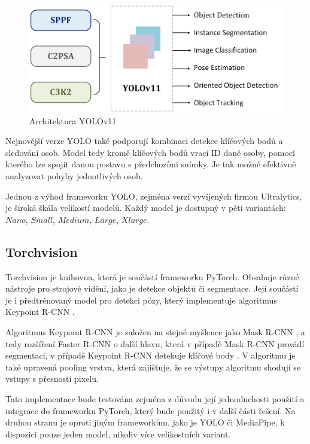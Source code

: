 \begin{figure}[]
    \centering
    \includegraphics[height=0.2\textheight]{Figures/yolo_v11.png}
    \caption{Architektura YOLOv11 \cite{yolov11}}
    \label{fig:yolov11}
\end{figure}

Nejnovější verze YOLO také podporují kombinaci detekce klíčových bodů a
sledování osob. Model tedy kromě klíčových bodů vrací ID dané osoby, pomocí
kterého lze spojit danou postavu s předchozími snímky. Je tak možné efektivně
analyzovat pohyby jednotlivých osob.

Jednou z výhod framevorku YOLO, zejména verzí vyvíjených firmou Ultralytics, je
široká škála velikostí modelů. Každý model je dostupný v pěti variantách:
$Nano$, $Small$, $Medium$, $Large$, $Xlarge$.

\subsection{Torchvision}

Torchvision je knihovna, která je součástí frameworku PyTorch. Obsahuje různé
nástroje pro strojové vidění, jako je detekce objektů či segmentace. Její
součástí je i předtrénovaný model pro detekci pózy, který implementuje
algoritmus Keypoint R-CNN \cite{keypoint-rcnn}.

Algoritmus Keypoint R-CNN je založen na stejné myšlence jako Mask R-CNN
\cite{mask-r-cnn}, a tedy rozšíření Faster R-CNN o další hlavu, která v případě
Mask R-CNN provádí segmentaci, v případě Keypoint R-CNN detekuje klíčové body
\cite{keypoint-rcnn}. V algoritmu je také upravená pooling vrstva, která
zajišťuje, že se výstupy algoritmu shodují se vstupy s přesností pixelu.

Tato implementace bude testována zejména z důvodu její jednoduchosti použití a
integrace do frameworku PyTorch, který bude použitý i v další části řešení. Na
druhou stranu je oproti jiným frameworkům, jako je YOLO či MediaPipe, k
dispozici pouze jeden model, nikoliv více velikostních variant.

